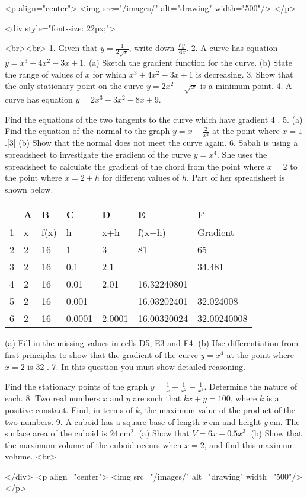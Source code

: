 <p align="center">
<img src="/images/" alt="drawing" width="500"/>
</p>

<div style="font-size: 22px;">

<br><br>
1. Given that $y=\frac{1}{2 \sqrt{x}}$, write down $\frac{\mathrm{d} y}{\mathrm{~d} x}$.
2. A curve has equation $y=x^{3}+4 x^{2}-3 x+1$.
(a) Sketch the gradient function for the curve.
(b) State the range of values of $x$ for which $x^{3}+4 x^{2}-3 x+1$ is decreasing.
3. Show that the only stationary point on the curve $y=2 x^{2}-\sqrt{x}$ is a minimum point.
4. A curve has equation $y=2 x^{3}-3 x^{2}-8 x+9$.

Find the equations of the two tangents to the curve which have gradient 4 .
5. (a) Find the equation of the normal to the graph $y=x-\frac{2}{x^{2}}$ at the point where $x=1$.[3]
(b) Show that the normal does not meet the curve again.
6. Sabah is using a spreadsheet to investigate the gradient of the curve $y=x^{4}$. She uses the spreadsheet to calculate the gradient of the chord from the point where $x=2$ to the point where $x=2+h$ for different values of $h$. Part of her spreadsheet is shown below.

\begin{tabular}{|l|l|l|l|l|l|l|}
\hline & A & B & C & D & E & F \\
\hline 1 & x & f(x) & h & x+h & f(x+h) & Gradient \\
\hline 2 & 2 & 16 & 1 & 3 & 81 & 65 \\
\hline 3 & 2 & 16 & 0.1 & 2.1 & & 34.481 \\
\hline 4 & 2 & 16 & 0.01 & 2.01 & 16.32240801 & \\
\hline 5 & 2 & 16 & 0.001 & & 16.03202401 & 32.024008 \\
\hline 6 & 2 & 16 & 0.0001 & 2.0001 & 16.00320024 & 32.00240008 \\
\hline
\end{tabular}
(a) Fill in the missing values in cells D5, E3 and F4.
(b) Use differentiation from first principles to show that the gradient of the curve $y=x^{4}$ at the point where $x=2$ is 32 .
7. In this question you must show detailed reasoning.

Find the stationary points of the graph $y=\frac{1}{x}+\frac{1}{x^{2}}-\frac{1}{x^{3}}$.
Determine the nature of each.
8. Two real numbers $x$ and $y$ are such that $k x+y=100$, where $k$ is a positive constant. Find, in terms of $k$, the maximum value of the product of the two numbers.
9. A cuboid has a square base of length $x \mathrm{~cm}$ and height $y \mathrm{~cm}$. The surface area of the cuboid is $24 \mathrm{~cm}^{2}$.
(a) Show that $V=6 x-0.5 x^{3}$.
(b) Show that the maximum volume of the cuboid occurs when $x=2$, and find this maximum volume.
<br>

</div>
<p align="center">
<img src="/images/" alt="drawing" width="500"/>
</p>

